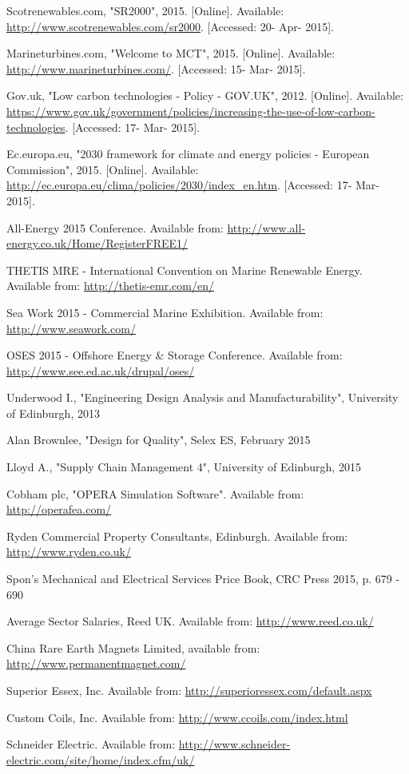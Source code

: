 \documentclass[a4paper,11pt]{article}
\begin{document}
\begin{thebibliography}{99}
	Scotrenewables.com, "SR2000", 2015. [Online]. Available: \url{http://www.scotrenewables.com/sr2000}. [Accessed: 20- Apr- 2015].
	
	Marineturbines.com, "Welcome to MCT", 2015. [Online]. Available: \url{http://www.marineturbines.com/}. [Accessed: 15- Mar- 2015].
	
	Gov.uk, "Low carbon technologies - Policy - GOV.UK", 2012. [Online]. Available: \url{https://www.gov.uk/government/policies/increasing-the-use-of-low-carbon-technologies}. [Accessed: 17- Mar- 2015].
	
	Ec.europa.eu, "2030 framework for climate and energy policies - European Commission", 2015. [Online]. Available: \url{http://ec.europa.eu/clima/policies/2030/index_en.htm}. [Accessed: 17- Mar- 2015].
	
	All-Energy 2015 Conference. Available from: \url{http://www.all-energy.co.uk/Home/RegisterFREE1/}

	THETIS MRE - International Convention on Marine Renewable Energy. Available from:   \url{http://thetis-emr.com/en/}
	
	Sea Work 2015 - Commercial Marine Exhibition. Available from: \url{http://www.seawork.com/}
	
	OSES 2015 - Offshore Energy \& Storage Conference. Available from: \url{http://www.see.ed.ac.uk/drupal/oses/}
	
	Underwood I., "Engineering Design Analysis and Manufacturability", University of Edinburgh, 2013

	Alan Brownlee, "Design for Quality", Selex ES, February 2015
	
	Lloyd A., "Supply Chain Management 4", University of Edinburgh, 2015
	
	Cobham plc, "OPERA Simulation Software". Available from: \url{http://operafea.com/}
		
	Ryden Commercial Property Consultants, Edinburgh. Available from: \url{http://www.ryden.co.uk/}
	
	Spon's Mechanical and Electrical Services Price Book, CRC Press 2015, p. 679 - 690
	
	Average Sector Salaries, Reed UK. Available from: \url{http://www.reed.co.uk/}
	
	China Rare Earth Magnets Limited, available from: \url{http://www.permanentmagnet.com/}
	
	Superior Essex, Inc. Available from: \url{http://superioressex.com/default.aspx}
	
	Custom Coils, Inc. Available from: \url{http://www.ccoils.com/index.html}
	
	Schneider Electric. Available from: \url{http://www.schneider-electric.com/site/home/index.cfm/uk/}

\end{thebibliography}
\end{document}
